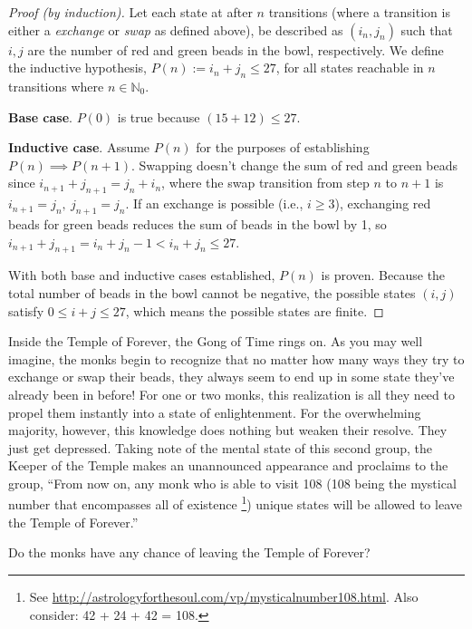 \documentclass[a4paper]{article}
\begin{document}
	\begin{proof}[Proof (by induction)]

		Let each state at after $n$ transitions (where a transition is
		either a \textit{exchange} or \textit{swap} as defined above),
		be described as $(i_{n}, j_{n})$ such that $i, j$ are the
		number of red and green beads in the bowl, respectively. We
		define the inductive hypothesis, $P(n) := i_{n} + j_{n}
		\le 27$, for all states reachable in $n$
		transitions where $n \in \mathbb{N}_0$.

		\textbf{Base case}. $P(0)$ is true because $(15 + 12) \leq 27$.

		\textbf{Inductive case}. Assume $P(n)$ for the purposes of
		establishing $P(n) \implies P(n+1)$. Swapping doesn't change
		the sum of red and green beads since $i_{n+1} + j_{n+1} = j_{n}
		+ i_{n}$, where the swap transition from step $n$ to $n+1$ is
		$i_{n+1} = j_{n},\ j_{n+1} = j_{n}$. If an exchange is possible
		(i.e., $i \ge 3$), exchanging red beads for green beads reduces
		the sum of beads in the bowl by 1, so $i_{n+1} + j_{n+1} =
		i_{n} + j_{n} - 1 < i_{n} + j_{n} \le 27$.

		With both base and inductive cases established, $P(n)$ is
		proven. Because the total number of beads in the bowl cannot be
		negative, the possible states $(i, j)$ satisfy $0 \le i + j \le
		27$, which means the possible states are finite.

	\end{proof}

	Inside the Temple of Forever, the Gong of Time rings on. As you may
	well imagine, the monks begin to recognize that no matter how many ways
	they try to exchange or swap their beads, they always seem to end up in
	some state they’ve already been in before! For one or two monks, this
	realization is all they need to propel them instantly into a state of
	enlightenment. For the overwhelming majority, however, this knowledge
	does nothing but weaken their resolve. They just get depressed. Taking
	note of the mental state of this second group, the Keeper of the Temple
	makes an unannounced appearance and proclaims to the group, “From now
	on, any monk who is able to visit 108 (108 being the mystical number
	that encompasses all of existence \footnote{See
	\url{http://astrologyforthesoul.com/vp/mysticalnumber108.html}. Also
	consider: 42 + 24 + 42 = 108.}) unique states will be allowed to leave the
	Temple of Forever.”

	Do the monks have any chance of leaving the Temple of Forever?
\end{document}
